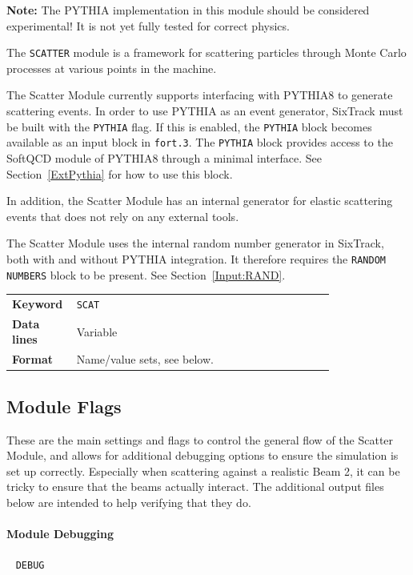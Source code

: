 \textcolor{notered}{\textbf{Note:} The PYTHIA implementation in this module should be considered experimental! It is not yet fully tested for correct physics.}

The \texttt{SCATTER} module is a framework for scattering particles through Monte Carlo processes at various points in the machine.

The Scatter Module currently supports interfacing with PYTHIA8 to generate scattering events.
In order to use PYTHIA as an event generator, SixTrack must be built with the \texttt{PYTHIA} flag.
If this is enabled, the \texttt{PYTHIA} block becomes available as an input block in \texttt{fort.3}.
The \texttt{PYTHIA} block provides access to the SoftQCD module of PYTHIA8 through a minimal interface.
See Section~\ref{ExtPythia} for how to use this block.

In addition, the Scatter Module has an internal generator for elastic scattering events that does not rely on any external tools.

The Scatter Module uses the internal random number generator in SixTrack, both with and without PYTHIA integration.
It therefore requires the \texttt{RANDOM NUMBERS} block to be present.
See Section~\ref{Input:RAND}.

\bigskip
\begin{tabular}{@{}lp{0.8\linewidth}}
    \textbf{Keyword}    & \texttt{SCAT}\index{SCAT} \\
    \textbf{Data lines} & Variable \\
    \textbf{Format}     & Name/value sets, see below.
\end{tabular}

\subsection{Module Flags}

These are the main settings and flags to control the general flow of the Scatter Module, and allows for additional debugging options to ensure the simulation is set up correctly.
Especially when scattering against a realistic Beam 2, it can be tricky to ensure that the beams actually interact.
The additional output files below are intended to help verifying that they do.

\paragraph{Module Debugging}~ \texttt{DEBUG}\\

